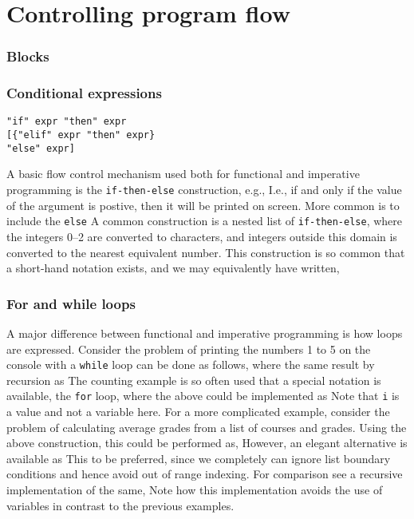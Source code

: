 \chapter{Controlling program flow}
\label{chap:flow}


\subsection{Blocks}
\subsection{Conditional expressions}
\begin{lstlisting}[language=EBNF]
"if" expr "then" expr 
[{"elif" expr "then" expr}
"else" expr]
\end{lstlisting}
A basic flow control mechanism used both for functional and imperative programming is the \texttt{if-then-else} construction, e.g.,
I.e., if and only if the value of the argument is postive, then it will be printed on screen. More common is to include the \texttt{else} 
A common construction is a nested list of \texttt{if-then-else},
where the integers 0--2 are converted to characters, and integers outside this domain is converted to the nearest equivalent number. This construction is so common that a short-hand notation exists, and we may equivalently have written,

\subsection{For and while loops}
A major difference between functional and imperative programming is how loops are expressed. Consider the problem of printing the numbers 1 to 5 on the console with a \texttt{while} loop can be done as follows,
where the same result by recursion as
The counting example is so often used that a special notation is available, the \texttt{for} loop, where the above could be implemented as
Note that \texttt{i} is a value and not a variable here. For a more complicated example, consider the problem of calculating average grades from a list of courses and grades. Using the above construction, this could be performed as,
However, an elegant alternative is available as
This to be preferred, since we completely can ignore list boundary conditions and hence avoid out of range indexing. For comparison see a recursive implementation of the same,
Note how this implementation avoids the use of variables in contrast to the previous examples.



